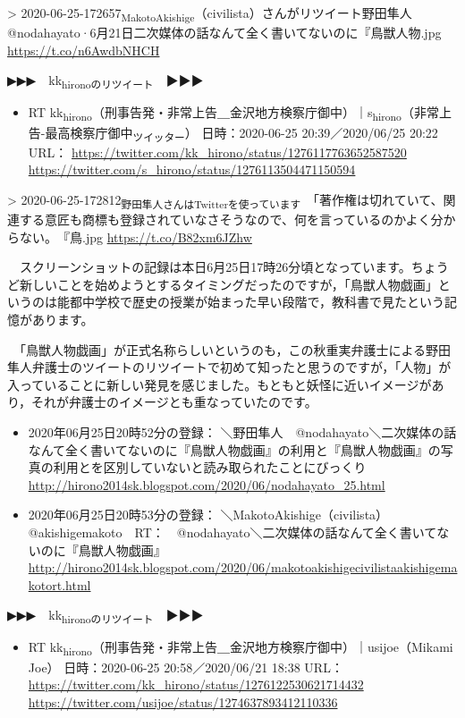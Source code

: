 \documentclass[]{ltjarticle}
\begin{document}
> 2020-06-25-172657\textsubscript{MakotoAkishige}（civilista）さんがリツイート野田隼人@nodahayato·6月21日二次媒体の話なんて全く書いてないのに『鳥獣人物.jpg \url{https://t.co/n6AwdbNHCH}  

▶▶▶　kk\textsubscript{hironoのリツイート}　▶▶▶  

\begin{itemize}
\item RT kk\textsubscript{hirono}（刑事告発・非常上告＿金沢地方検察庁御中）｜s\textsubscript{hirono}（非常上告-最高検察庁御中\textsubscript{ツイッター}） 日時：2020-06-25 20:39／2020/06/25 20:22 URL： \url{https://twitter.com/kk\_hirono/status/1276117763652587520} \url{https://twitter.com/s\_hirono/status/1276113504471150594}
\end{itemize}

> 2020-06-25-172812\textsubscript{野田隼人さんはTwitterを使っています}　「著作権は切れていて、関連する意匠も商標も登録されていなさそうなので、何を言っているのかよく分からない。　『鳥.jpg \url{https://t.co/B82xm6JZhw}  

　スクリーンショットの記録は本日6月25日17時26分頃となっています。ちょうど新しいことを始めようとするタイミングだったのですが，「鳥獣人物戯画」というのは能都中学校で歴史の授業が始まった早い段階で，教科書で見たという記憶があります。

　「鳥獣人物戯画」が正式名称らしいというのも，この秋重実弁護士による野田隼人弁護士のツイートのリツイートで初めて知ったと思うのですが，「人物」が入っていることに新しい発見を感じました。もともと妖怪に近いイメージがあり，それが弁護士のイメージとも重なっていたのです。

\begin{itemize}
\item 2020年06月25日20時52分の登録： ＼野田隼人　@nodahayato＼二次媒体の話なんて全く書いてないのに『鳥獣人物戯画』の利用と『鳥獣人物戯画』の写真の利用とを区別していないと読み取られたことにびっくり \url{http://hirono2014sk.blogspot.com/2020/06/nodahayato\_25.html}

\item 2020年06月25日20時53分の登録： ＼MakotoAkishige（civilista）　@akishigemakoto　RT：　@nodahayato＼二次媒体の話なんて全く書いてないのに『鳥獣人物戯画』 \url{http://hirono2014sk.blogspot.com/2020/06/makotoakishigecivilistaakishigemakotort.html}
\end{itemize}

▶▶▶　kk\textsubscript{hironoのリツイート}　▶▶▶  

\begin{itemize}
\item RT kk\textsubscript{hirono}（刑事告発・非常上告＿金沢地方検察庁御中）｜usijoe（Mikami Joe） 日時：2020-06-25 20:58／2020/06/21 18:38 URL： \url{https://twitter.com/kk\_hirono/status/1276122530621714432} \url{https://twitter.com/usijoe/status/1274637893412110336}
\end{itemize}
\end{document}
